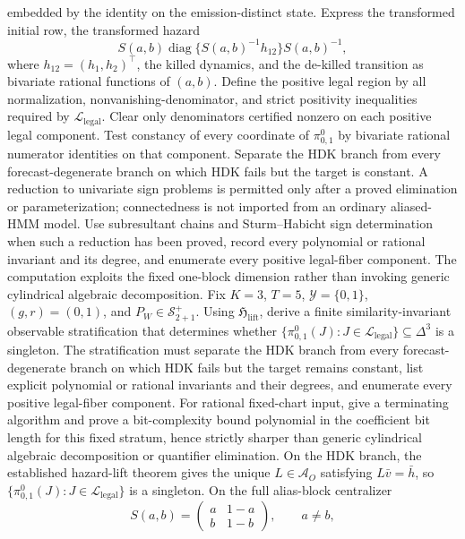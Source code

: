 embedded by the identity on the emission-distinct state. Express the transformed initial row, the transformed hazard
\[
 S(a,b)\operatorname{diag}\{S(a,b)^{-1}h_{12}\}S(a,b)^{-1},
\]
where \(h_{12}=(h_1,h_2)^{\top}\), the killed dynamics, and the de-killed transition as bivariate rational functions of \((a,b)\). Define the positive legal region by all normalization, nonvanishing-denominator, and strict positivity inequalities required by \(\mathcal L_{\mathrm{legal}}\). Clear only denominators certified nonzero on each positive legal component. Test constancy of every coordinate of \(\pi^0_{0,1}\) by bivariate rational numerator identities on that component. Separate the HDK branch from every forecast-degenerate branch on which HDK fails but the target is constant. A reduction to univariate sign problems is permitted only after a proved elimination or parameterization; connectedness is not imported from an ordinary aliased-HMM model. Use subresultant chains and Sturm--Habicht sign determination when such a reduction has been proved, record every polynomial or rational invariant and its degree, and enumerate every positive legal-fiber component. The computation exploits the fixed one-block dimension rather than invoking generic cylindrical algebraic decomposition.
Fix \(K=3\), \(T=5\), \(\mathcal Y=\{0,1\}\), \((g,r)=(0,1)\), and \(P_W\in\mathcal S^{+}_{2+1}\). Using \(\mathfrak H_{\mathrm{lift}}\), derive a finite similarity-invariant observable stratification that determines whether \(\{\pi^0_{0,1}(J):J\in\mathcal L_{\mathrm{legal}}\}\subseteq\Delta^3\) is a singleton. The stratification must separate the HDK branch from every forecast-degenerate branch on which HDK fails but the target remains constant, list explicit polynomial or rational invariants and their degrees, and enumerate every positive legal-fiber component. For rational fixed-chart input, give a terminating algorithm and prove a bit-complexity bound polynomial in the coefficient bit length for this fixed stratum, hence strictly sharper than generic cylindrical algebraic decomposition or quantifier elimination.
On the HDK branch, the established hazard-lift theorem gives the unique \(L\in\mathcal A_O\) satisfying \(L\bar v=\bar h\), so \(\{\pi^0_{0,1}(J):J\in\mathcal L_{\mathrm{legal}}\}\) is a singleton. On the full alias-block centralizer
\[
 S(a,b)=\begin{pmatrix}a&1-a\\b&1-b\end{pmatrix},\qquad a\ne b,
\]
